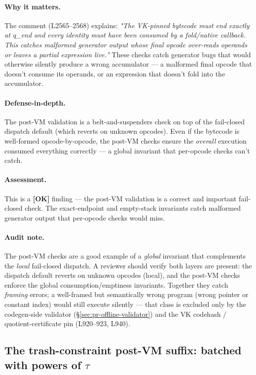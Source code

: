 \paragraph{Why it matters.} The comment (L2565--2568) explains:
\emph{"The VK-pinned bytecode must end exactly at q\_end and
every identity must have been consumed by a fold/native callback.
This catches malformed generator output whose final opcode
over-reads operands or leaves a partial expression live."} These
checks catch generator bugs that would otherwise silently produce
a wrong accumulator --- a malformed final opcode that doesn't
consume its operands, or an expression that doesn't fold into the
accumulator.

\paragraph{Defense-in-depth.} The post-VM validation is a
belt-and-suspenders check on top of the fail-closed dispatch
default (which reverts on unknown opcodes). Even if the bytecode
is well-formed opcode-by-opcode, the post-VM checks ensure the
\emph{overall} execution consumed everything correctly --- a
global invariant that per-opcode checks can't catch.

\paragraph{Assessment.} This is a
\textcolor{tracegreen}{\textbf{[OK]}} finding --- the post-VM
validation is a correct and important fail-closed check. The
exact-endpoint and empty-stack invariants catch malformed
generator output that per-opcode checks would miss.

\paragraph{Audit note.} The post-VM checks are a good example of
a \emph{global} invariant that complements the \emph{local}
fail-closed dispatch. A reviewer should verify both layers are
present: the dispatch default reverts on unknown opcodes (local),
and the post-VM checks enforce the global consumption/emptiness
invariants. Together they catch \emph{framing} errors; a
well-framed but semantically wrong program (wrong pointer or
constant index) would still execute silently --- that class is
excluded only by the codegen-side validator
(§\ref{sec:pr-offline-validator}) and the VK codehash /
quotient-certificate pin (L920--923, L940).

\subsection{The trash-constraint post-VM suffix: batched with powers of $\tau$}
\label{sec:pr-trash}


